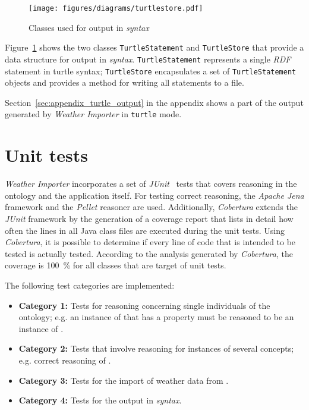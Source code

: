 \begin{figure}
\centering
\texttt{[image: figures/diagrams/turtlestore.pdf]}
\caption{Classes used for output in \emph{ syntax}}
\label{fig:importer_turtlestore}
\end{figure}

Figure~\ref{fig:importer_turtlestore} shows the two classes \texttt{TurtleStatement} and \texttt{TurtleStore} that provide a data structure for output in \emph{ syntax}. \texttt{TurtleStatement} represents a single \emph{RDF} statement in turtle syntax; \texttt{TurtleStore} encapsulates a set of \texttt{TurtleStatement} objects and provides a method for writing all statements to a file.

Section~\ref{sec:appendix_turtle_output} in the appendix shows a part of the output generated by \emph{Weather Importer} in \texttt{turtle} mode.

\section{Unit tests}
\label{sec:importer_tests}

\emph{Weather Importer} incorporates a set of \emph{JUnit}~\cite{junit} tests that covers reasoning in the \smarthomeweather ontology and the application itself. For testing correct reasoning, the \emph{Apache Jena} framework and the \emph{Pellet} reasoner are used. Additionally, \emph{Cobertura} extends the \emph{JUnit} framework by the generation of a coverage report that lists in detail how often the lines in all Java class files are executed during the unit tests. Using \emph{Cobertura}, it is possible to determine if every line of code that is intended to be tested is actually tested. According to the analysis generated by \emph{Cobertura}, the coverage is \num{100}~\% for all classes that are target of unit tests.

The following test categories are implemented:
\begin{itemize}
  \item \textbf{Category 1:} Tests for  reasoning concerning single individuals of the ontology; e.g. an instance of  that has a  property must be reasoned to be an instance of .
  \item \textbf{Category 2:} Tests that involve reasoning for instances of several concepts; e.g. correct reasoning of .
  \item \textbf{Category 3:} Tests for the import of weather data from \yrno.
  \item \textbf{Category 4:} Tests for the output in \emph{ syntax}.
\end{itemize}

